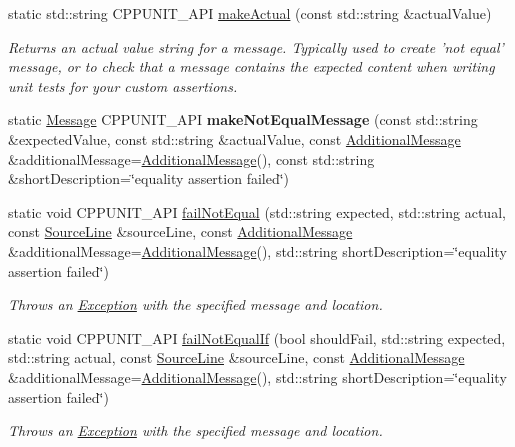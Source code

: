 \begin{DoxyCompactItemize}
static std\+::string C\+P\+P\+U\+N\+I\+T\+\_\+\+A\+P\+I \hyperlink{struct_asserter_ae52920ca7ffd981df61d7a3cfd88793b}{make\+Actual} (const std\+::string \&actual\+Value)
\begin{DoxyCompactList}\small\item\em Returns an actual value string for a message. Typically used to create 'not equal' message, or to check that a message contains the expected content when writing unit tests for your custom assertions. \end{DoxyCompactList}\item 
\hypertarget{struct_asserter_adb8ac36c8f0d385430e5a087a66219db}{static \hyperlink{class_message}{Message} C\+P\+P\+U\+N\+I\+T\+\_\+\+A\+P\+I {\bfseries make\+Not\+Equal\+Message} (const std\+::string \&expected\+Value, const std\+::string \&actual\+Value, const \hyperlink{class_additional_message}{Additional\+Message} \&additional\+Message=\hyperlink{class_additional_message}{Additional\+Message}(), const std\+::string \&short\+Description=\char`\"{}equality assertion failed\char`\"{})}\label{struct_asserter_adb8ac36c8f0d385430e5a087a66219db}

\item 
static void C\+P\+P\+U\+N\+I\+T\+\_\+\+A\+P\+I \hyperlink{struct_asserter_ac6234767e7d986bace97dc44f8d80d6c}{fail\+Not\+Equal} (std\+::string expected, std\+::string actual, const \hyperlink{class_source_line}{Source\+Line} \&source\+Line, const \hyperlink{class_additional_message}{Additional\+Message} \&additional\+Message=\hyperlink{class_additional_message}{Additional\+Message}(), std\+::string short\+Description=\char`\"{}equality assertion failed\char`\"{})
\begin{DoxyCompactList}\small\item\em Throws an \hyperlink{class_exception}{Exception} with the specified message and location. \end{DoxyCompactList}\item 
static void C\+P\+P\+U\+N\+I\+T\+\_\+\+A\+P\+I \hyperlink{struct_asserter_a3a805c9f8c641d65353bcff2da80624f}{fail\+Not\+Equal\+If} (bool should\+Fail, std\+::string expected, std\+::string actual, const \hyperlink{class_source_line}{Source\+Line} \&source\+Line, const \hyperlink{class_additional_message}{Additional\+Message} \&additional\+Message=\hyperlink{class_additional_message}{Additional\+Message}(), std\+::string short\+Description=\char`\"{}equality assertion failed\char`\"{})
\begin{DoxyCompactList}\small\item\em Throws an \hyperlink{class_exception}{Exception} with the specified message and location. \end{DoxyCompactList}\end{DoxyCompactItemize}


